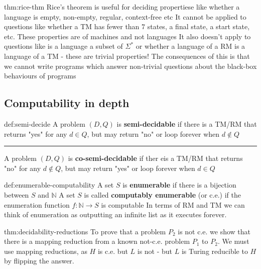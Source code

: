 \documentclass[landscape, 8pt]{extarticle}
\begin{document}
\begin{multicols}{3}
\newpage


\begin{thm}{thm:rice-thm}{}
Rice's theorem is useful for deciding propertiese like whether a language is empty, non-empty, regular, context-free etc\newline
It cannot be applied to questions like whether a TM has fewer than $7$ states, a final state, a start state, etc. These properties are of machines and not languages\newline
It also doesn't apply to questions like is a language a subset of $\Sigma^{*}$ or whether a language of a RM is a language of a TM - these are trivial properties!
The consequences of this is that we cannot write programs which answer non-trivial questions about the black-box behaviours of programs
\end{thm}



\subsection*{Computability in depth}

\begin{dfn}{def:semi-decide}{}
A problem $(D, Q)$ is \textbf{semi-decidable} if there is a TM/RM that returns "yes" for any $d\in Q$, but may return "no" or loop forever when $d\not\in Q$
\newline
\noindent\rule{\textwidth}{0.2pt}
A problem $(D, Q)$ is \textbf{co-semi-decidable} if ther eis a TM/RM that returns "no" for any $d\not\in Q$, but may return "yes" or loop forever when $d\in Q$
\end{dfn}


\begin{dfn}{def:enumerable-computability}{}
A set $S$ is \textbf{enumerable} if there is a bijection between $S$ and $\mathbb{N}$
\newline
A set $S$ is called \textbf{computably enumerable} (or c.e.) if the enumeration function $f : \mathbb{N} \to S$ is computable \newline
In terms of RM and TM we can think of enumeration as outputting an infinite
list as it executes forever.
\end{dfn}


\begin{thm}{thm:decidability-reductions}{}
To prove that a problem $P_{2}$ is not c.e. we show that there is a mapping reduction from a known not-c.e. problem $P_{1}$ to $P_{2}$. We must use mapping reductions, as $H$ is c.e. but $L$ is not - but $L$ is Turing reducible to $H$ by flipping the answer.


\end{thm}
\end{multicols}
\end{document}
